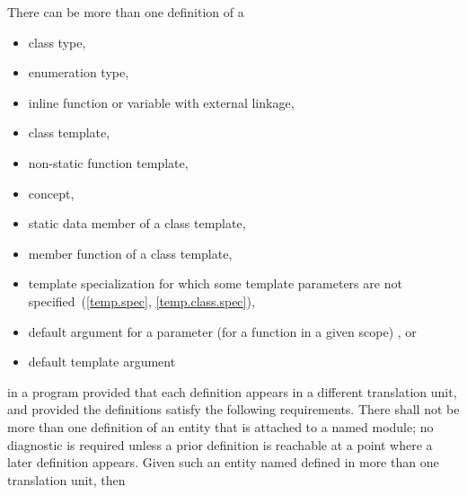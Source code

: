 \pnum
There can be more than one definition of a
\begin{itemize}
\item class type,
\item enumeration type,
\item inline function or variable with external linkage,
\item class template,
\item non-static function template,
\item concept,
\item static data member of a class template,
\item member function of a class template,
\item template specialization for which some template parameters are not
specified~(\ref{temp.spec}, \ref{temp.class.spec}),
\item default argument for a parameter (for a function in a given scope)%
, or
\item default template argument
\end{itemize}
in a program provided that
each definition appears in a different translation unit, and
provided the definitions satisfy the following requirements.
There shall not be more than one definition
of an entity
that is attached to a named module;
no diagnostic is required unless a prior definition
is reachable at a point where a later definition appears.
Given such
an entity named  defined in more than one translation unit,
then
